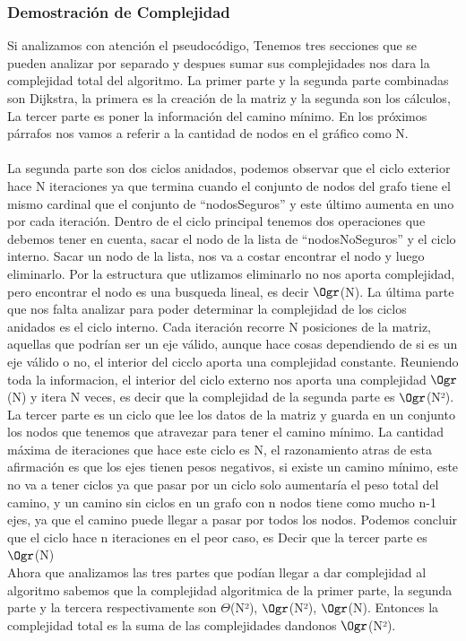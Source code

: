 \documentclass[spanish,12pt]{article}
\begin{document}
\subsubsection{Demostración de Complejidad}

Si analizamos con atención el pseudocódigo, Tenemos tres secciones que se pueden analizar por separado y despues sumar sus complejidades nos dara la complejidad total del algoritmo. La primer parte y la segunda parte combinadas son Dijkstra, la primera es la creación de la matriz y la segunda son los cálculos, La tercer parte es poner la información del camino mínimo. En los próximos párrafos nos vamos a referir a la cantidad de nodos en el gráfico como N. 
\\
\\
 \tab La segunda parte son dos ciclos anidados, podemos observar que el ciclo exterior hace N iteraciones ya que termina cuando el conjunto de nodos del grafo tiene el mismo cardinal que el conjunto de ``nodosSeguros'' y este último aumenta en uno por cada iteración. Dentro de el ciclo principal tenemos dos operaciones que debemos tener en cuenta, sacar el nodo de la lista de ``nodosNoSeguros'' y el ciclo interno. Sacar un nodo de la lista, nos va a costar encontrar el nodo y luego eliminarlo. Por la estructura que utlizamos eliminarlo no nos aporta complejidad, pero encontrar el nodo es una busqueda lineal, es decir $\Ogr$(N). La última parte que nos falta analizar para poder determinar la complejidad de los ciclos anidados es el ciclo interno. Cada iteración recorre N posiciones de la matriz, aquellas que podrían ser un eje válido, aunque hace cosas dependiendo de si es un eje válido o no, el interior del cicclo aporta una complejidad constante. Reuniendo toda la informacion, el interior del ciclo externo nos aporta una complejidad $\Ogr$(N) y itera N veces, es decir que la complejidad de la segunda parte es $\Ogr$(N²).
\\
\tab La tercer parte es un ciclo que lee los datos de la matriz y guarda en un conjunto los nodos que tenemos que atravezar para tener el camino mínimo. La cantidad máxima de iteraciones que hace este ciclo es N, el razonamiento atras de esta afirmación es que los ejes tienen pesos negativos, si existe un camino mínimo, este no va a tener ciclos ya que pasar por un ciclo solo aumentaría el peso total del camino, y un camino sin ciclos en un grafo con n nodos tiene como mucho n-1 ejes, ya que el camino puede llegar a pasar por todos los nodos. Podemos concluir que el ciclo hace n iteraciones en el peor caso, es Decir que la tercer parte es $\Ogr$(N)
\\
\tab Ahora que analizamos las tres partes que podían llegar a dar complejidad al algoritmo sabemos que la complejidad algoritmica de la primer parte, la segunda parte y la tercera respectivamente son $\Theta$(N²), $\Ogr$(N²), $\Ogr$(N). Entonces la complejidad total es la suma de las complejidades dandonos $\Ogr$(N²).
\end{document}
